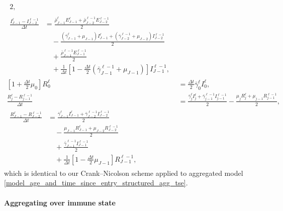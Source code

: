 \documentclass[USenglish]{article}
\begin{document}
\begin{subequations}
\begin{align}
\begin{split}
      {2},
    \end{split}
    \\
    \begin{split}
      \frac{I_{J - 1}^{\ell} - I_{J - 2}^{\ell - 1}}{\Delta t}
      &= \frac{\bar{\rho}_{J - 1}^{\ell} E_{J - 1}^{\ell}
        + \bar{\rho}_{J - 2}^{\ell - 1} E_{J - 2}^{\ell - 1}} {2}
      \\ & \quad {}
      - \frac{(\bar{\gamma}_{J - 1}^{\ell} + \mu_{J - 1}) I_{J - 1}^{\ell}
        + (\bar{\gamma}_{J - 2}^{\ell - 1} + \mu_{J - 2}) I_{J - 2}^{\ell - 1}}
      {2}
      \\ & \quad {}
      + \frac{\bar{\rho}_{J - 1}^{\ell - 1} E_{J - 1}^{\ell - 1}} {2}
      \\ & \quad {}
      + \frac{1}{\Delta t} \left[
        1 - \frac{\Delta t}{2} (\bar{\gamma}_{J - 1}^{\ell - 1} + \mu_{J - 1})
      \right] I_{J - 1}^{\ell - 1},
    \end{split}
    \\
    \left[1 + \frac{\Delta t}{2} \mu_0\right] R_0^{\ell}
    &= \frac{\Delta t}{2} \bar{\gamma}_0^{\ell} I_0^{\ell},
    \\
    \frac{R_j^{\ell} - R_{j - 1}^{\ell - 1}}{\Delta t}
    &= \frac{\bar{\gamma}_j^{\ell} I_j^{\ell}
      + \bar{\gamma}_{j - 1}^{\ell - 1} I_{j - 1}^{\ell - 1}}
      {2}
      - \frac{\mu_j R_j^{\ell}
      + \mu_{j - 1} R_{j - 1}^{\ell - 1}}
      {2},
    \\
    \begin{split}
      \frac{R_{J - 1}^{\ell} - R_{J - 2}^{\ell - 1}}{\Delta t}
      &= \frac{\bar{\gamma}_{J - 1}^{\ell} I_{J - 1}^{\ell}
        + \bar{\gamma}_{J - 2}^{\ell - 1} I_{J - 2}^{\ell - 1}}
      {2}
      \\ & \quad {}
      - \frac{\mu_{J - 1} R_{J - 1}^{\ell}
        + \mu_{J - 2} R_{J - 2}^{\ell - 1}}
      {2}
      \\ & \quad {}
      + \frac{\bar{\gamma}_{J - 1}^{\ell - 1} I_{J - 1}^{\ell - 1}}{2}
      \\ & \quad {}
      + \frac{1}{\Delta t} \left[
        1 - \frac{\Delta t}{2} \mu_{J - 1}
      \right] R_{J - 1}^{\ell - 1},
    \end{split}
  \end{align}
\end{subequations}
which is identical to our Crank--Nicolson scheme applied to aggregated
model \eqref{model_age_and_time_since_entry_structured_agg_tse}.


\paragraph{Aggregating over immune state}
\end{document}
